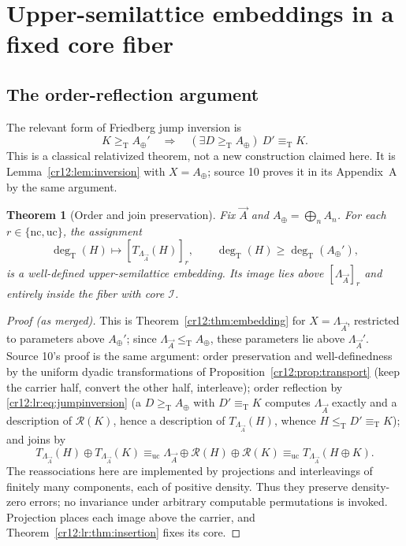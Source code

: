 \documentclass[11pt,letterpaper]{article}
\theoremstyle{plain}
\newtheorem{theorem}{Theorem}[section]
\theoremstyle{definition}
\theoremstyle{remark}
\numberwithin{equation}{section}
\newcommand{\leT}{\leq_{\mathrm T}}
\newcommand{\geT}{\geq_{\mathrm T}}
\newcommand{\eqT}{\equiv_{\mathrm T}}
\newcommand{\equc}{\equiv_{\mathrm{uc}}}
\newcommand{\degT}{\deg_{\mathrm T}}
\newcommand{\Rcode}{\mathcal R}
\newcommand{\I}{\mathcal I}
\newcommand{\Aplus}{A_{\oplus}}          %
\newcommand{\Lam}{\Lambda_{\vec A}}      %
\begin{document}
\section{Upper-semilattice embeddings in a fixed core fiber}\label{cr12:lr:sec:embedding}
\subsection{The order-reflection argument}
The relevant form of Friedberg jump inversion is
\begin{equation}\label{cr12:lr:eq:jumpinversion}
 K\geT \Aplus'\quad\Longrightarrow\quad
 (\exists D\geT \Aplus)\ D'\eqT K.
\end{equation}
This is a classical relativized theorem, not a new construction claimed here. It is
Lemma~\ref{cr12:lem:inversion} with $X=\Aplus$; source 10 proves it in its
Appendix~A by the same argument.

\begin{theorem}[Order and join preservation]\label{cr12:lr:thm:embedding}
Fix $\vec A$ and $\Aplus=\bigoplus_n A_n$. For each $r\in\{\mathrm{nc},\mathrm{uc}\}$,
the assignment
\[
 \degT(H)\longmapsto [T_{\Lam}(H)]_r,
 \qquad \degT(H)\geq\degT(\Aplus'),
\]
is a well-defined upper-semilattice embedding. Its image lies above $[\Lam]_r$ and
entirely inside the fiber with core $\I$.
\end{theorem}
\begin{proof}[Proof (as merged)]
This is Theorem~\ref{cr12:thm:embedding} for $X=\Lam$, restricted to parameters above
$\Aplus'$; since $\Lam\leT\Aplus$, these parameters lie above $\Lam'$. Source 10's
proof is the same argument: order preservation and well-definedness by the uniform
dyadic transformations of Proposition~\ref{cr12:prop:transport} (keep the carrier half,
convert the other half, interleave); order reflection by \eqref{cr12:lr:eq:jumpinversion}
(a $D\geT\Aplus$ with $D'\eqT K$ computes $\Lam$ exactly and a description of
$\Rcode(K)$, hence a description of $T_{\Lam}(H)$, whence $H\leT D'\eqT K$); and joins
by
\begin{equation}\label{cr12:lr:eq:fjoin}
 T_{\Lam}(H)\oplus T_{\Lam}(K)
 \equc \Lam\oplus\Rcode(H)\oplus\Rcode(K)
 \equc T_{\Lam}(H\oplus K).
\end{equation}
The reassociations here are implemented by projections and interleavings of finitely
many components, each of positive density. Thus they preserve density-zero errors; no
invariance under arbitrary computable permutations is invoked. Projection places each
image above the carrier, and Theorem~\ref{cr12:lr:thm:insertion} fixes its core.
\end{proof}
\end{document}
